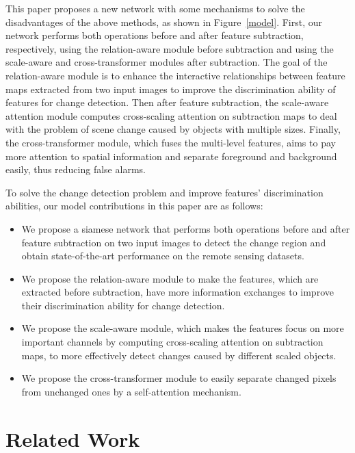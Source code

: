 \documentclass[letterpaper]{article} \usepackage{aaai23}  \usepackage{times}  \usepackage{helvet}  \usepackage{courier}  \usepackage[hyphens]{url}  \usepackage{graphicx} \urlstyle{rm} \def\UrlFont{\rm}  \usepackage{natbib}  \usepackage{caption} \frenchspacing  \setlength{\pdfpagewidth}{8.5in}  \setlength{\pdfpageheight}{11in}  \usepackage{algorithm}
\begin{document}
This paper proposes a new network with some mechanisms to solve the disadvantages of the above methods, as shown in Figure~\ref{model}. First, our network performs both operations before and after feature subtraction, respectively, using the relation-aware module before subtraction and using the scale-aware and cross-transformer modules after subtraction. The goal of the relation-aware module is to enhance the interactive relationships between feature maps extracted from two input images to improve the discrimination ability of features for change detection.  Then after feature subtraction, the scale-aware attention module computes cross-scaling attention on subtraction maps to deal with the problem of scene change caused by objects with multiple sizes.  Finally, the cross-transformer module, which fuses the multi-level features, aims to pay more attention to spatial information and separate foreground and background easily, thus reducing false alarms.  

 
 To solve the change detection problem and improve features' discrimination abilities, our model contributions in this paper are as follows:
\begin{itemize}
\item We propose a siamese network that performs both operations before and after feature subtraction on two input images to detect the change region and obtain state-of-the-art performance on the remote sensing datasets.

\item We propose the relation-aware module to make the features, which are extracted before subtraction, 
have more information exchanges to improve their discrimination ability for change detection. 
\item We propose the scale-aware module, which makes the features focus on more important channels by computing cross-scaling attention on subtraction maps, to more effectively detect changes caused by different scaled objects.
\item We propose the cross-transformer module to easily separate changed pixels from unchanged ones by a self-attention mechanism. 
\end{itemize}

\section{Related Work}
\end{document}
